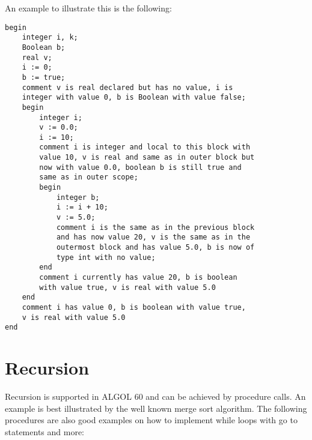 \documentclass{article}
\begin{document}
An example to illustrate this is the following:

\begin{lstlisting}[language={[60]algol}]
begin
    integer i, k;
    Boolean b;
    real v;
    i := 0;
    b := true;
    comment v is real declared but has no value, i is 
    integer with value 0, b is Boolean with value false;
    begin
        integer i;
        v := 0.0;
        i := 10;
        comment i is integer and local to this block with 
        value 10, v is real and same as in outer block but 
        now with value 0.0, boolean b is still true and 
        same as in outer scope;
        begin
            integer b;
            i := i + 10;
            v := 5.0;
            comment i is the same as in the previous block 
            and has now value 20, v is the same as in the 
            outermost block and has value 5.0, b is now of 
            type int with no value;
        end
        comment i currently has value 20, b is boolean 
        with value true, v is real with value 5.0
    end
    comment i has value 0, b is boolean with value true, 
    v is real with value 5.0
end
\end{lstlisting}

\newpage

\section{Recursion}
Recursion is supported in ALGOL 60 and can be achieved by procedure calls. An example is best illustrated by the well known merge sort algorithm. The following procedures are also good examples on how to implement while loops with go to statements and more:
\end{document}
